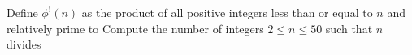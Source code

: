 Define $\phi^{!}(n)$ as the product of all positive integers less than or equal to $n$ and relatively prime to  Compute the number of integers $2 \le n \le 50$ such that $n$ divides 